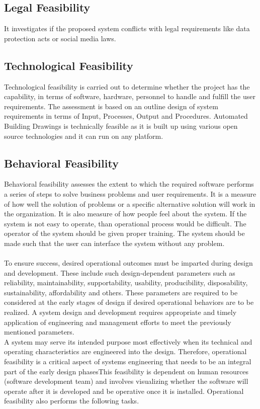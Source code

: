 \subsection{Legal Feasibility}
\noindent It investigates if the proposed system conflicts with legal requirements like data
protection acts or social media laws.

\subsection{Technological Feasibility}
\noindent Technological feasibility is carried out to determine whether the project has the capability, in terms
of software, hardware, personnel to handle and fulfill the user requirements. The assessment is based
on an outline design of system requirements in terms of Input, Processes, Output and Procedures.
Automated Building Drawings is technically feasible as it is built up using various open source technologies and it can run on any platform.
\subsection{Behavioral Feasibility}
Behavioral feasibility assesses the extent to which the required software performs a series of steps to solve business problems and user requirements. It is a measure of how well the solution of problems or a specific alternative solution will work in the organization. It is also measure of how people feel about the system. If the system is not easy to operate, than operational process would be difficult. The operator of the system should be given proper training. The system should be made such that the user can interface the system without any problem.\\\\

To ensure success, desired operational outcomes must be imparted during design and development. These include such design-dependent parameters such as reliability, maintainability, supportability, usability, producibility, disposability, sustainability, affordability and others. These parameters are required to be considered at the early stages of design if desired operational behaviors are to be realized. A system design and development requires appropriate and timely application of engineering and management efforts to meet the previously mentioned parameters. \\
A system may serve its intended purpose most effectively when its technical and operating characteristics are engineered into the design. Therefore, operational feasibility is a critical aspect of systems engineering that needs to be an integral part of the early design phasesThis feasibility is dependent on human resources (software development team) and involves visualizing whether the software will operate after it is developed and be operative once it is installed. Operational feasibility also performs the following tasks.

